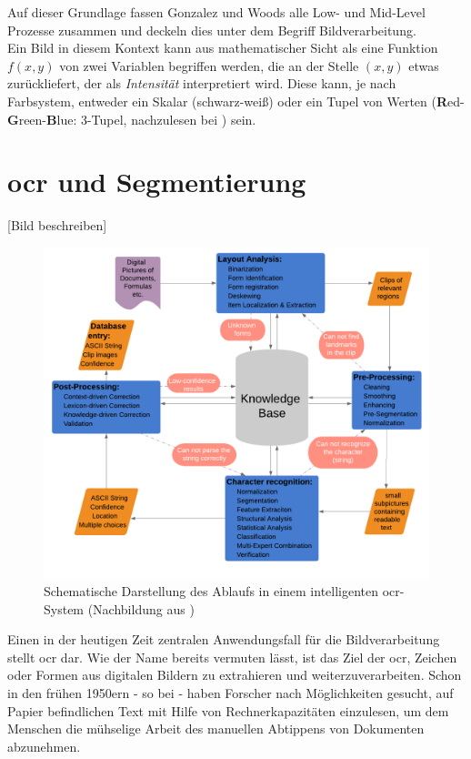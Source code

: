 		Auf dieser Grundlage fassen Gonzalez und Woods alle Low- und Mid-Level Prozesse zusammen und deckeln dies unter dem Begriff Bildverarbeitung. \\
		
		Ein Bild in diesem Kontext kann aus mathematischer Sicht als eine Funktion $f(x, y)$ von zwei Variablen begriffen werden, die an der Stelle $(x, y)$ etwas zurückliefert, der als \textit{Intensität} interpretiert wird. Diese kann, je nach Farbsystem, entweder ein Skalar (schwarz-weiß) oder ein Tupel von Werten (\textbf{R}ed-\textbf{G}reen-\textbf{B}lue: 3-Tupel, nachzulesen bei \cite{rgb-info}) sein. 
	
	
	\section{\gls{ocr} und Segmentierung}
	\color{red} [Bild beschreiben] \color{black}
	
		\begin{figure}[H]
			\centering
			\includegraphics[width=\linewidth]{Ablauf-OCR_Cheriet-et-al.pdf}
			\caption[typisches \gls{ocr}-Ablaufschema]{Schematische Darstellung des 
				Ablaufs in einem intelligenten \gls{ocr}-System (Nachbildung aus 
				\cite[Seite 7]{cher-et-al-ocr})}
			\label{fig:ocr-system}
		\end{figure}
	
		Einen in der heutigen Zeit zentralen Anwendungsfall für die Bildverarbeitung stellt \gls{ocr} dar. Wie der Name bereits vermuten lässt, ist das Ziel der \gls{ocr}, Zeichen oder Formen aus digitalen Bildern zu extrahieren und weiterzuverarbeiten. Schon in den frühen 1950ern - so bei \cite{cher-et-al-ocr} - haben Forscher nach Möglichkeiten gesucht, auf Papier befindlichen Text mit Hilfe von Rechnerkapazitäten einzulesen, um dem Menschen die mühselige Arbeit des manuellen Abtippens von Dokumenten abzunehmen.

